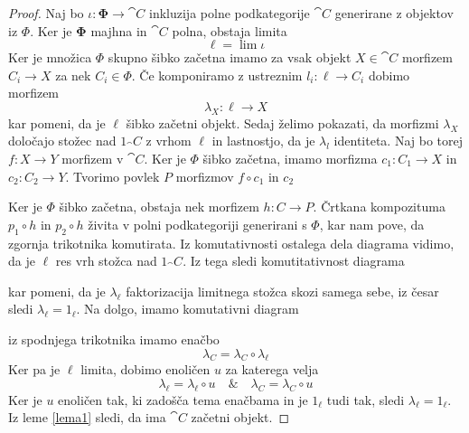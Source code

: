 \documentclass[../kategoricna_logika.tex]{subfiles}
\begin{document}
\begin{proof}
Naj bo $\iota : \bm{\Phi} \to \cat{C}$ inkluzija polne podkategorije $\cat{C}$ generirane z objektov iz $\Phi$. Ker je $\bm{\Phi}$ majhna in $\cat{C}$ polna, obstaja limita
$$\ell = \lim \iota$$
Ker je množica $\Phi$ skupno šibko začetna imamo za vsak objekt $X \in \cat{C}$ morfizem $C_i \to X$ za nek $C_i \in \Phi$. Če komponiramo z ustreznim $l_i : \ell \to C_i$ dobimo morfizem
$$\lambda_X : \ell \to X$$
kar pomeni, da je $\ell$ šibko začetni objekt. Sedaj želimo pokazati, da morfizmi $\lambda_X$ določajo stožec nad $1_\cat{C}$ z vrhom $\ell$ in lastnostjo, da je $\lambda_l$ identiteta. Naj bo torej $f : X \to Y$ morfizem v $\cat{C}$. Ker je $\Phi$ šibko začetna, imamo morfizma $c_1 : C_1 \to X$ in $c_2 : C_2 \to Y$. Tvorimo povlek $P$ morfizmov $f \circ c_1$ in $c_2$
\begin{center}
\end{center}
Ker je $\Phi$ šibko začetna, obstaja nek morfizem $h : C \to P$. Črtkana kompozituma $p_1 \circ h$ in $p_2 \circ h$ živita v polni podkategoriji generirani s $\Phi$, kar nam pove, da zgornja trikotnika komutirata. Iz komutativnosti ostalega dela diagrama vidimo, da je $\ell$ res vrh stožca nad $1_\cat{C}$. Iz tega sledi komutitativnost diagrama
\begin{center}
\end{center}
kar pomeni, da je $\lambda_\ell$ faktorizacija limitnega stožca skozi samega sebe, iz česar sledi $\lambda_\ell = 1_\ell$. Na dolgo, imamo komutativni diagram
\begin{center}
\end{center}
iz spodnjega trikotnika imamo enačbo
$$\lambda_C = \lambda_C \circ \lambda_\ell$$
Ker pa je $\ell$ limita, dobimo enoličen $u$ za katerega velja
$$\lambda_\ell = \lambda_\ell \circ u \quad \& \quad \lambda_C = \lambda_C \circ u$$
Ker je $u$ enoličen tak, ki zadošča tema enačbama in je $1_\ell$ tudi tak, sledi $\lambda_\ell = 1_\ell$. Iz leme \ref{lema1} sledi, da ima $\cat{C}$ začetni objekt.
\end{proof}
\end{document}
